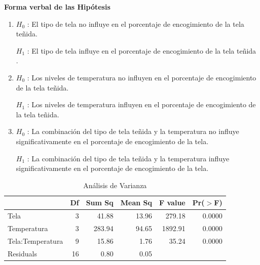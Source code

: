 \documentclass[12pt,letterpaper]{report}
\begin{document}
\textbf{Forma verbal de las Hipótesis}

\begin{enumerate}

\item $H_0$ : El tipo de tela no influye en el porcentaje de encogimiento de la tela teñida.

$H_1$ : El tipo de tela influye en el porcentaje de encogimiento de la tela teñida .

\item $H_0$ : Los niveles de temperatura no influyen en el porcentaje de encogimiento de
la tela teñida.

$H_1$ : Los niveles de temperatura influyen en el porcentaje de encogimiento de la
tela teñida.

\item $H_0$ : La combinación del tipo de tela teñida y la temperatura no influye significativamente en el porcentaje de encogimiento de la tela.

$H_1$ : La combinación del tipo de tela teñida y la temperatura influye significativamente en
el porcentaje de encogimiento de la tela.
\end{enumerate}

\begin{Schunk}
\end{Schunk}

\begin{table}[ht]
\centering
\begin{tabular}{lrrrrr}
  \hline
 & Df & Sum Sq & Mean Sq & F value & Pr($>$F) \\ 
  \hline
Tela & 3 & 41.88 & 13.96 & 279.18 & 0.0000 \\ 
Temperatura & 3 & 283.94 & 94.65 & 1892.91 & 0.0000 \\ 
Tela:Temperatura & 9 & 15.86 & 1.76 & 35.24 & 0.0000 \\ 
Residuals & 16 & 0.80 & 0.05 &  &  \\ 
   \hline
\end{tabular}
\caption{Análisis de Varianza}
\end{table}
\end{document}
